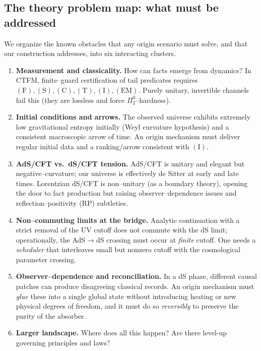 \documentclass[10pt]{article}
\theoremstyle{definition}
\theoremstyle{plain}
\begin{document}
\subsection{The theory problem map: what must be addressed}
\label{subsec:intro-map}

We organize the known obstacles that any origin scenario must solve, and that our construction addresses, into six interacting clusters.

\begin{enumerate}
  \item \textbf{Measurement and classicality.} How can facts emerge from dynamics? In CTFM, finite–guard certification of tail predicates requires \((\mathrm F),(\mathrm S),(\mathrm C),(\mathrm T),(\mathrm I),(\mathrm{EM})\). Purely unitary, invertible channels fail this (they are lossless and force $\Pi^0_2$–hardness). 

  \item \textbf{Initial conditions and arrows.} The observed universe exhibits extremely low gravitational entropy initially (Weyl curvature hypothesis) and a consistent macroscopic arrow of time. An origin mechanism must deliver regular initial data and a ranking/arrow consistent with \((\mathrm I)\).

  \item \textbf{AdS/CFT vs.\ dS/CFT tension.} AdS/CFT is unitary and elegant but negative–curvature; our universe is effectively de Sitter at early and late times. Lorentzian dS/CFT is non–unitary (as a boundary theory), opening the door to fact production but raising observer–dependence issues and reflection–positivity (RP) subtleties.

  \item \textbf{Non–commuting limits at the bridge.} Analytic continuation with a strict removal of the UV cutoff does not commute with the dS limit; operationally, the AdS$\to$dS crossing must occur at \emph{finite} cutoff. One needs a \emph{scheduler} that interleaves small but nonzero cutoff with the cosmological parameter crossing.

  \item \textbf{Observer–dependence and reconciliation.} In a dS phase, different causal patches can produce disagreeing classical records. An origin mechanism must \emph{glue} these into a single global state without introducing heating or new physical degrees of freedom, and it must do so \emph{reversibly} to preserve the purity of the absorber.

  \item \textbf{Larger landscape.} Where does all this happen? Are there level-up governing principles and laws?

\end{enumerate}
\end{document}
